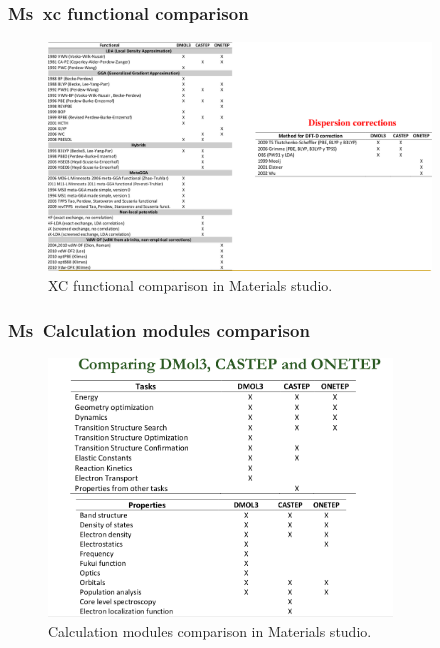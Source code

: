 \frame
{
	\frametitle{\textrm{Ms~xc functional  comparison}}
\begin{figure}[h!]
\centering
\vspace*{-0.15in}
\includegraphics[height=2.40in,width=4.00in,viewport=0 0 1261 751,clip]{Figures/MS-xc_functional-compare.png}
\caption{\tiny \textrm{XC functional comparison in Materials studio.}}%
\label{MS-Module_xc-functional}
\end{figure}
}

\frame
{
	\frametitle{\textrm{Ms~Calculation modules comparison}}
\begin{figure}[h!]
\centering
\vspace*{-0.18in}
\includegraphics[height=2.70in,width=3.60in,viewport=0 0 969 728,clip]{Figures/MS-Caluculator-compare-2.png}
\caption{\tiny \textrm{Calculation modules comparison in Materials studio.}}%
\label{MS-Module_xc-functional}
\end{figure}
}


